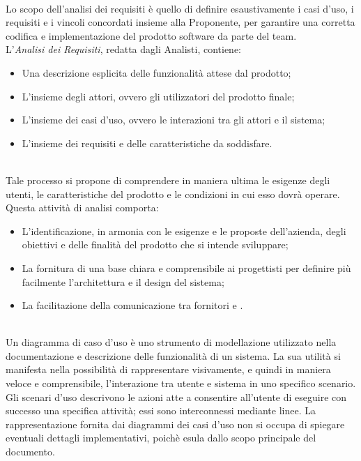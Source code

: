 \\
Lo scopo dell'analisi dei requisiti è quello di definire esaustivamente i casi d'uso, i requisiti e i vincoli concordati insieme alla Proponente, per garantire una corretta codifica e implementazione del prodotto software da parte del team.\\
L'\textit{Analisi dei Requisiti}, redatta dagli Analisti, contiene:
\begin{itemize}
    \item Una descrizione esplicita delle funzionalità attese dal prodotto;
    \item L'insieme degli attori, ovvero gli utilizzatori del prodotto finale;
    \item L'insieme dei casi d'uso, ovvero le interazioni tra gli attori e il sistema;
    \item L'insieme dei requisiti e delle caratteristiche da soddisfare.
\end{itemize}
\\
Tale processo si propone di comprendere in maniera ultima le esigenze degli utenti, le caratteristiche del prodotto e le condizioni in cui esso dovrà operare.\\
Questa attività di analisi comporta:
\begin{itemize}
    \item L'identificazione, in armonia con le esigenze e le proposte dell'azienda, degli obiettivi e delle finalità del prodotto che si intende sviluppare;
    \item La fornitura di una base chiara e comprensibile ai progettisti per definire più facilmente l'architettura e il design del sistema;
    \item La facilitazione della comunicazione tra fornitori e .
\end{itemize}
\\
Un diagramma di caso d'uso è uno strumento di modellazione utilizzato nella documentazione e descrizione delle funzionalità di un sistema. La sua utilità si manifesta nella possibilità di rappresentare visivamente, e quindi in maniera veloce e comprensibile, l'interazione tra utente e sistema in uno specifico scenario. Gli scenari d'uso descrivono le azioni atte a consentire all'utente di eseguire con successo una specifica attività; essi sono interconnessi mediante linee. La rappresentazione fornita dai diagrammi dei casi d'uso non si occupa di spiegare eventuali dettagli implementativi, poichè esula dallo scopo principale del documento.\\
